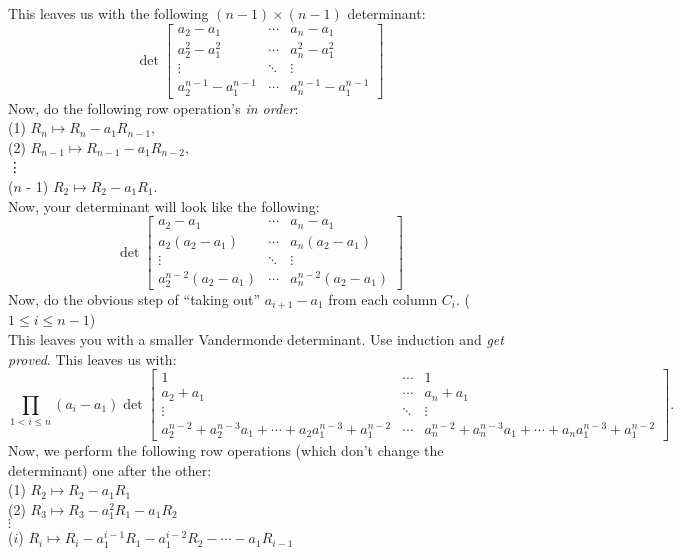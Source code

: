 \documentclass{article}
\begin{document}
\begin{enumerate}
	This leaves us with the following $(n-1)\times(n-1)$ determinant:
	\[\det 
		\begin{bmatrix}
			a_2 - a_1 & \cdots & a_n - a_1\\
			a_2^2  - a_1^2 & \cdots & a_n^2  - a_1^2\\
			\vdots & \ddots & \vdots \\
			a_2^{n-1} - a_1^{n-1} & \cdots & a_n^{n-1} - a_1^{n-1}
		\end{bmatrix}
	\]
	Now, do the following row operation's \emph{in order}:\\
	(1) $R_n \mapsto R_n - a_1R_{n-1},$\\
	(2) $R_{n-1} \mapsto R_{n-1} - a_1R_{n-2},$ \\ 
	\vdots\\
	($n$ - 1) $R_2 \mapsto R_2 - a_1R_1.$\\
	Now, your determinant will look like the following:
	\[\det 
		\begin{bmatrix}
			a_2 - a_1 & \cdots & a_n - a_1\\
			a_2(a_2  - a_1) & \cdots & a_n(a_2  - a_1)\\
			\vdots & \ddots & \vdots \\
			a_2^{n-2}(a_2  - a_1) & \cdots & a_{n}^{n-2}(a_2  - a_1)
		\end{bmatrix}
	\]
	Now, do the obvious step of ``taking out'' $a_{i+1} - a_1$ from each column $C_i.$ ($1 \le i \le n-1$)\\
	This leaves you with a smaller Vandermonde determinant. Use induction and \emph{get proved}.
	\iffalse
	This leaves us with:
	\[\prod_{1 < i \le n}(a_i - a_1)
		\det
		\begin{bmatrix}
			1 & \cdots & 1\\
			a_2 + a_1 & \cdots & a_n + a_1\\
			\vdots & \ddots & \vdots \\
			a_2^{n-2} + a_2^{n-3}a_1 + \cdots + a_2a_1^{n-3} + a_1^{n-2} & \cdots & a_n^{n-2} + a_n^{n-3}a_1 + \cdots + a_na_1^{n-3} + a_1^{n-2}
		\end{bmatrix}.
	\]
	Now, we perform the following row operations (which don't change the determinant) one after the other:\\
	(1)	$R_2 \mapsto R_2 - a_1R_1$\\
	(2) $R_3 \mapsto R_3 - a_1^2R_1 - a_1R_2$\\
	$\vdots$\\
	($i$) $R_i \mapsto R_i - a_1^{i-1}R_1 - a_1^{i-2}R_2 -\cdots - a_1R_{i-1}$\\

\end{enumerate}
\end{document}
